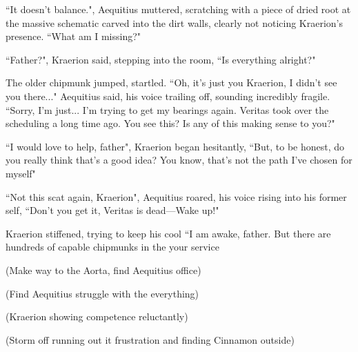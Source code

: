 ``It doesn't balance.", Aequitius muttered, scratching with a piece of dried root at the massive schematic carved into the dirt walls, clearly not noticing Kraerion's presence. ``What am I missing?"

``Father?", Kraerion said, stepping into the room, ``Is everything alright?"

The older chipmunk jumped, startled. ``Oh, it's just you Kraerion, I didn't see you there..." Aequitius said, his voice trailing off, sounding incredibly fragile. ``Sorry, I'm just... I'm trying to get my bearings again. Veritas took over the scheduling a long time ago. You see this? Is any of this making sense to you?"

``I would love to help, father", Kraerion began hesitantly, ``But, to be honest, do you really think that's a good idea? You know, that's not the path I've chosen for myself"

``Not this scat again, Kraerion", Aequitius roared, his voice rising into his former self, ``Don't you get it, Veritas is dead---Wake up!"

Kraerion stiffened, trying to keep his cool ``I am awake, father. But there are hundreds of capable chipmunks in the your service





(Make way to the Aorta, find Aequitius office)

(Find Aequitius struggle with the everything)

(Kraerion showing competence reluctantly)

(Storm off running out it frustration and finding Cinnamon outside)


